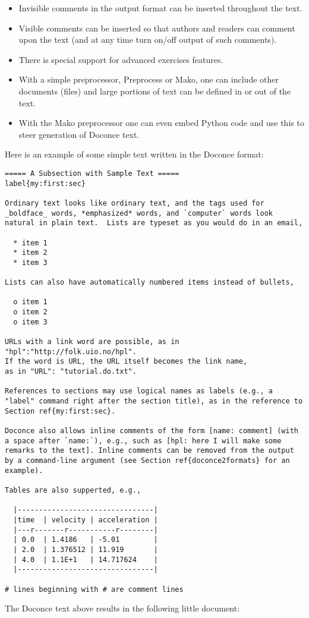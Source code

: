\documentclass[twoside]{article}
\begin{document}
\begin{itemize}
  \item Invisible comments in the output format can be inserted throughout
    the text.

  \item Visible comments can be inserted so that authors and readers can
    comment upon the text (and at any time turn on/off output of such
    comments).

  \item There is special support for advanced exercises features.

  \item With a simple preprocessor, Preprocess or Mako, one can include
    other documents (files) and large portions of text can be defined
    in or out of the text.

  \item With the Mako preprocessor one can even embed Python
    code and use this to steer generation of Doconce text.
\end{itemize}

\noindent
Here is an example of some simple text written in the Doconce format:
\begin{Verbatim}[fontsize=\fontsize{9pt}{9pt},tabsize=8,baselinestretch=0.85,
fontfamily=tt,xleftmargin=7mm]
===== A Subsection with Sample Text =====
label{my:first:sec}

Ordinary text looks like ordinary text, and the tags used for
_boldface_ words, *emphasized* words, and `computer` words look
natural in plain text.  Lists are typeset as you would do in an email,

  * item 1
  * item 2
  * item 3

Lists can also have automatically numbered items instead of bullets,

  o item 1
  o item 2
  o item 3

URLs with a link word are possible, as in "hpl":"http://folk.uio.no/hpl".
If the word is URL, the URL itself becomes the link name,
as in "URL": "tutorial.do.txt".

References to sections may use logical names as labels (e.g., a
"label" command right after the section title), as in the reference to
Section ref{my:first:sec}.

Doconce also allows inline comments of the form [name: comment] (with
a space after `name:`), e.g., such as [hpl: here I will make some
remarks to the text]. Inline comments can be removed from the output
by a command-line argument (see Section ref{doconce2formats} for an
example).

Tables are also supperted, e.g.,

  |--------------------------------|
  |time  | velocity | acceleration |
  |---r-------r-----------r--------|
  | 0.0  | 1.4186   | -5.01        |
  | 2.0  | 1.376512 | 11.919       |
  | 4.0  | 1.1E+1   | 14.717624    |
  |--------------------------------|

# lines beginning with # are comment lines
\end{Verbatim}
\noindent
The Doconce text above results in the following little document:
\end{document}
